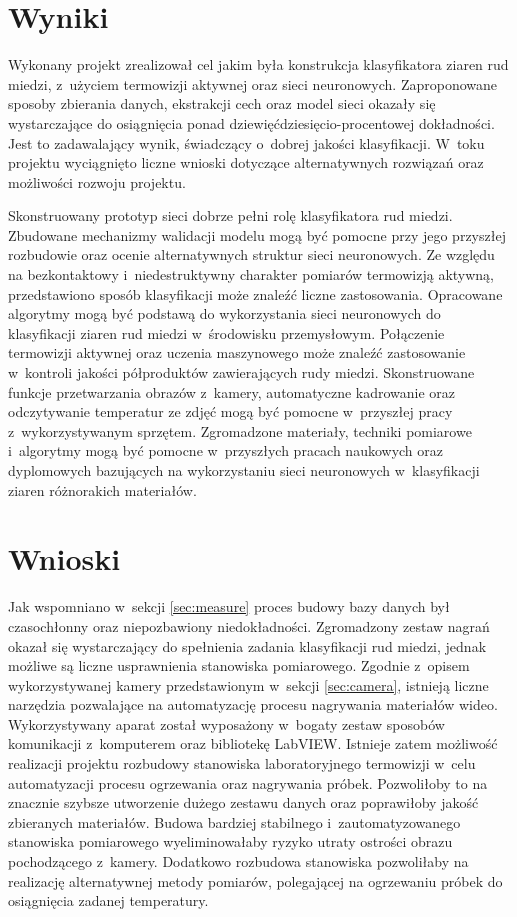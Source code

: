 \section{Wyniki}
Wykonany projekt zrealizował cel jakim była konstrukcja klasyfikatora ziaren
rud miedzi, z~użyciem termowizji aktywnej oraz sieci neuronowych.
Zaproponowane sposoby zbierania danych, ekstrakcji cech oraz model sieci
okazały się wystarczające do osiągnięcia ponad dziewięćdziesięcio-procentowej
dokładności.
Jest to zadawalający wynik, świadczący o~dobrej jakości klasyfikacji.
W~toku projektu wyciągnięto liczne wnioski dotyczące alternatywnych
rozwiązań oraz możliwości rozwoju projektu.

Skonstruowany prototyp sieci dobrze pełni rolę klasyfikatora rud miedzi.
Zbudowane mechanizmy walidacji modelu mogą być pomocne przy jego
przyszłej rozbudowie oraz ocenie alternatywnych struktur sieci neuronowych.
Ze względu na bezkontaktowy i~niedestruktywny charakter pomiarów
termowizją aktywną, przedstawiono sposób klasyfikacji może znaleźć liczne
zastosowania.
Opracowane algorytmy mogą być podstawą do wykorzystania sieci neuronowych
do klasyfikacji ziaren rud miedzi w~środowisku przemysłowym.
Połączenie termowizji aktywnej oraz uczenia maszynowego może znaleźć
zastosowanie w~kontroli jakości półproduktów zawierających rudy miedzi.
Skonstruowane funkcje przetwarzania obrazów z~kamery, automatyczne kadrowanie
oraz odczytywanie temperatur ze zdjęć mogą być pomocne w~przyszłej pracy
z~wykorzystywanym sprzętem.
Zgromadzone materiały, techniki pomiarowe i~algorytmy mogą być pomocne
w~przyszłych pracach naukowych oraz dyplomowych bazujących na wykorzystaniu
sieci neuronowych w~klasyfikacji ziaren różnorakich materiałów.

\section{Wnioski}
Jak wspomniano w~sekcji \ref{sec:measure} proces budowy bazy danych był
czasochłonny oraz niepozbawiony niedokładności.
Zgromadzony zestaw nagrań okazał się wystarczający do spełnienia zadania
klasyfikacji rud miedzi, jednak możliwe są liczne usprawnienia stanowiska
pomiarowego.
Zgodnie z~opisem wykorzystywanej kamery przedstawionym w~sekcji
\ref{sec:camera}, istnieją liczne narzędzia pozwalające na automatyzację
procesu nagrywania materiałów wideo.
Wykorzystywany aparat został wyposażony w~bogaty zestaw sposobów komunikacji
z~komputerem oraz bibliotekę LabVIEW.
Istnieje zatem możliwość realizacji projektu rozbudowy stanowiska
laboratoryjnego termowizji w~celu automatyzacji procesu ogrzewania oraz
nagrywania próbek.
Pozwoliłoby to na znacznie szybsze utworzenie dużego zestawu danych oraz
poprawiłoby jakość zbieranych materiałów.
Budowa bardziej stabilnego i~zautomatyzowanego stanowiska pomiarowego
wyeliminowałaby ryzyko utraty ostrości obrazu pochodzącego z~kamery.
Dodatkowo rozbudowa stanowiska pozwoliłaby na realizację alternatywnej
metody pomiarów, polegającej na ogrzewaniu próbek do osiągnięcia zadanej
temperatury.

